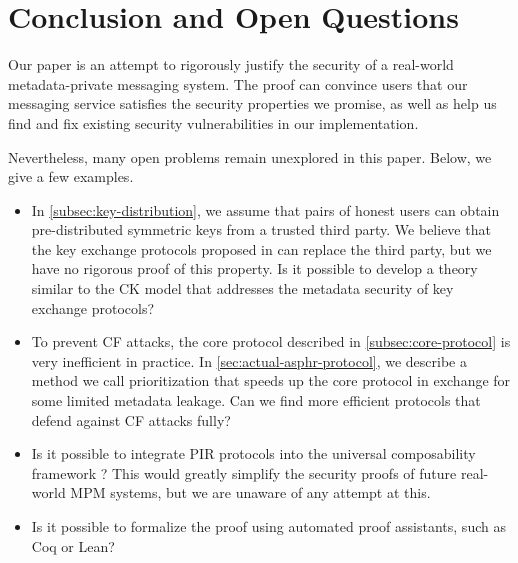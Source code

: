 \section{Conclusion and Open Questions}
Our paper is an attempt to rigorously justify the security of a real-world metadata-private messaging system. The proof can convince users that our messaging service satisfies the security properties we promise, as well as help us find and fix existing security vulnerabilities in our implementation. 

Nevertheless, many open problems remain unexplored in this paper. Below, we give a few examples.
\begin{itemize}
    \item In \cref{subsec:key-distribution}, we assume that pairs of honest users can obtain pre-distributed symmetric keys from a trusted third party. We believe that the key exchange protocols proposed in \cite{whitepaper} can replace the third party, but we have no rigorous proof of this property. Is it possible to develop a theory similar to the CK model \cite{CK2001keyexchange} that addresses the metadata security of key exchange protocols?
    
    \item To prevent CF attacks, the core protocol described in \cref{subsec:core-protocol} is very inefficient in practice. In \cref{sec:actual-asphr-protocol}, we describe a method we call prioritization that speeds up the core protocol in exchange for some limited metadata leakage. Can we find more efficient protocols that defend against CF attacks fully?
    
    \item Is it possible to integrate PIR protocols into the universal composability framework \cite{canetti2020uc}? This would greatly simplify the security proofs of future real-world MPM systems, but we are unaware of any attempt at this.
    
    \item Is it possible to formalize the proof using automated proof assistants, such as Coq or Lean?
\end{itemize}